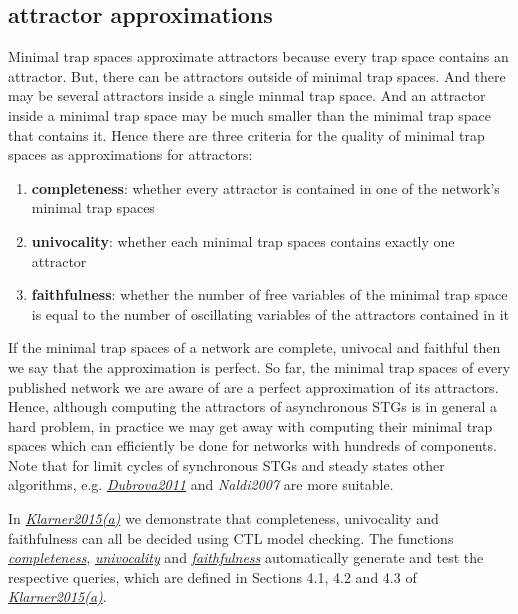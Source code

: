 \documentclass[letterpaper,10pt,english]{sphinxmanual}
\begin{document}
\subsection{attractor approximations}
\label{Manual:attractor-approximations}
Minimal trap spaces approximate attractors because every trap space contains an attractor.
But, there can be attractors outside of minimal trap spaces.
And there may be several attractors inside a single minmal trap space.
And an attractor inside a minimal trap space may be much smaller than the minimal trap space that contains it.
Hence there are three criteria for the quality of minimal trap spaces as approximations for attractors:
\begin{enumerate}
\item {} 
\textbf{completeness}: whether every attractor is contained in one of the network's minimal trap spaces

\item {} 
\textbf{univocality}: whether each minimal trap spaces contains exactly one attractor

\item {} 
\textbf{faithfulness}: whether the number of free variables of the minimal trap space is equal to the number of oscillating variables of the attractors contained in it

\end{enumerate}

If the minimal trap spaces of a network are complete, univocal and faithful then we say that the approximation is perfect.
So far, the minimal trap spaces of every published network we are aware of are a perfect approximation of its attractors.
Hence, although computing the attractors of asynchronous STGs is in general a hard problem,
in practice we may get away with computing their minimal trap spaces which can efficiently be done for networks with hundreds of components.
Note that for limit cycles of synchronous STGs and steady states other algorithms, e.g. {\hyperref[Bibliography:dubrova2011]{\emph{Dubrova2011}}} and \emph{Naldi2007} are more suitable.

In {\hyperref[Bibliography:klarner2015trap]{\emph{Klarner2015(a)}}} we demonstrate that completeness, univocality and faithfulness can all be decided using CTL model checking.
The functions {\hyperref[AttractorDetection:completeness]{\emph{completeness}}}, {\hyperref[AttractorDetection:univocality]{\emph{univocality}}} and {\hyperref[AttractorDetection:faithfulness]{\emph{faithfulness}}} automatically generate and test the respective queries,
which are defined in Sections 4.1, 4.2 and 4.3 of {\hyperref[Bibliography:klarner2015trap]{\emph{Klarner2015(a)}}}.
\end{document}
